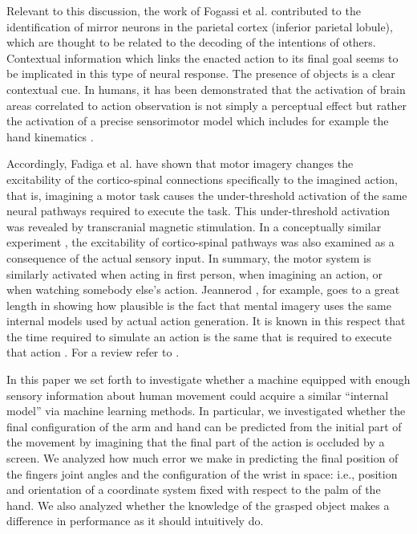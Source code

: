 Relevant to this discussion, the work of Fogassi et
al. \cite{fogassi-05} contributed to the identification of mirror
neurons in the parietal cortex (inferior parietal lobule), which are
thought to be related to the decoding of the intentions of
others. Contextual information which links the enacted action to its
final goal seems to be implicated in this type of neural response. The
presence of objects is a clear contextual cue. In humans, it has been
demonstrated that the activation of brain areas correlated to action
observation is not simply a perceptual effect but rather the
activation of a precise sensorimotor model which includes for example
the hand kinematics \cite{pozzo-06}.
 
Accordingly, Fadiga et al. \cite{fadiga-99,vargas-04} have shown that
motor imagery changes the excitability of the cortico-spinal
connections specifically to the imagined action, that is, imagining a
motor task causes the under-threshold activation of the same neural
pathways required to execute the task. This under-threshold activation
was revealed by transcranial magnetic stimulation. In a conceptually
similar experiment \cite{fadiga-05}, the excitability of
cortico-spinal pathways was also examined as a consequence of the
actual sensory input. In summary, the motor system is similarly
activated when acting in first person, when imagining an action, or
when watching somebody else's action. Jeannerod \cite{jeannerod-88},
for example, goes to a great length in showing how plausible is the
fact that mental imagery uses the same internal models used by actual
action generation.  It is known in this respect that the time required
to simulate an action is the same that is required to execute that
action \cite{sirigu-96}. For a review refer to \cite{jeannerod-99}.

In this paper we set forth to investigate whether a machine equipped
with enough sensory information about human movement could acquire a
similar ``internal model'' via machine learning methods. In
particular, we investigated whether the final configuration of the arm
and hand can be predicted from the initial part of the movement by
imagining that the final part of the action is occluded by a
screen. We analyzed how much error we make in predicting the final
position of the fingers joint angles and the configuration of the
wrist in space: i.e., position and orientation of a coordinate system
fixed with respect to the palm of the hand. We also analyzed whether
the knowledge of the grasped object makes a difference in performance
as it should intuitively do.

